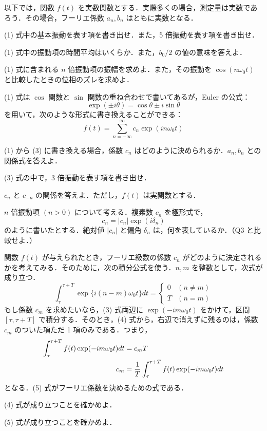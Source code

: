 \documentclass[a4paper,10pt]{article}
\newenvironment{questions}{\begin{list}{}{\setlength{\leftmargin}{3em}\setlength{\labelwidth}{2.8em}\setlength{\labelsep}{.2em}\setlength{\itemsep}{0pt}\setlength{\parsep}{0pt}\setlength{\topsep}{10pt}}}{\end{list}}
\newcommand{\q}[1]{\item[{\makebox[2.8em][l]{Q#1}}]}
\begin{document}
以下では，関数 $f(t)$ を実数関数とする．実際多くの場合，測定量は実数であろう．その場合，フーリエ係数 $a_n,b_n$ はともに実数となる．
\begin{questions}
\q{1} (1) 式中の基本振動を表す項を書き出せ．また，5 倍振動を表す項を書き出せ．
\q{2} (1) 式中の振動項の時間平均はいくらか．また，$b_0/2$ の値の意味を答えよ．
\q{3} (1) 式に含まれる $n$ 倍振動項の振幅を求めよ．また，その振動を $\cos(n\omega_0t)$ と比較したときの位相のズレを求めよ．
\end{questions}
(1) 式は $\cos$ 関数と $\sin$ 関数の重ね合わせで書いてあるが，Euler の公式：
\begin{equation}
\exp(\pm i\theta)=\cos\theta\pm i\sin\theta
\end{equation}
\noindent を用いて，次のような形式に書き換えることができる：
\begin{equation}
f(t)=\sum_{n=-\infty}^{\infty}c_n\exp(in\omega_0t)
\end{equation}
\begin{questions}
\q{4} (1) から (3) に書き換える場合，係数 $c_n$ はどのように決められるか．$a_n,b_n$ との関係式を答えよ．
\q{5} (3) 式の中で，3 倍振動を表す項を書き出せ．
\q{6} $c_n$ と $c_{-n}$ の関係を答えよ．ただし，$f(t)$ は実関数とする．
\q{7} $n$ 倍振動項 $(n>0)$ について考える．複素数 $c_n$ を極形式で，
\[
c_n=|c_n|\exp(i\delta_n)
\]
のように書いたとする．絶対値 $|c_n|$ と偏角 $\delta_n$ は，何を表しているか．（Q3 と比較せよ．）
\end{questions}
\newpage
関数 $f(t)$ が与えられたとき，フーリエ級数の係数 $c_n$ がどのように決定されるかを考えてみる．そのために，次の積分公式を使う．$n,m$ を整数として，次式が成り立つ．
\begin{equation}
\int_{\tau}^{\tau+T}\exp\{i(n-m)\omega_0t\}dt=
\begin{cases}0&(n\ne m)\\T&(n=m)\end{cases}
\end{equation}
もし係数 $c_m$ を求めたいなら，(3) 式両辺に $\exp(-im\omega_0t)$ をかけて，区間 $[\tau,\tau+T]$ で積分する．そのとき，(4) 式から，右辺で消えずに残るのは，係数 $c_m$ のついた項ただ 1 項のみである．つまり，
\begin{align}
\int_{\tau}^{\tau+T}f(t)\exp(-im\omega_0t)dt&=c_mT\notag\\
c_m&=\frac{1}{T}\int_{\tau}^{\tau+T}f(t)\exp(-im\omega_0t)dt
\end{align}
\noindent となる．(5) 式がフーリエ係数を決めるための式である．
\begin{questions}
\q{8} (4) 式が成り立つことを確かめよ．
\q{9} (5) 式が成り立つことを確かめよ．
\end{questions}
\end{document}
